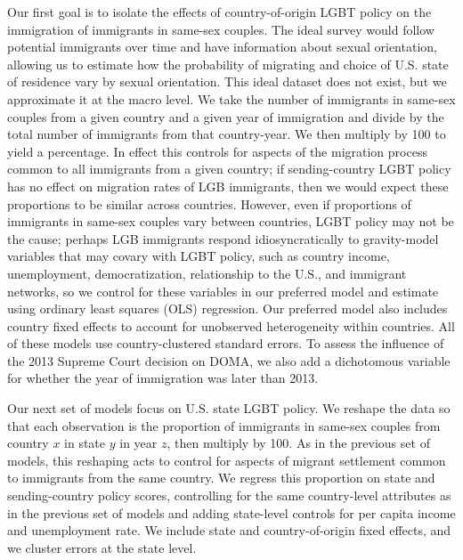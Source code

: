 \documentclass[
  11pt,
]{article}
\begin{document}
Our first goal is to isolate the effects of country-of-origin LGBT policy on the immigration of immigrants in same-sex couples. The ideal survey would follow potential immigrants over time and have information about sexual orientation, allowing us to estimate how the probability of migrating and choice of U.S. state of residence vary by sexual orientation. This ideal dataset does not exist, but we approximate it at the macro level. We take the number of immigrants in same-sex couples from a given country and a given year of immigration and divide by the total number of immigrants from that country-year. We then multiply by 100 to yield a percentage. In effect this controls for aspects of the migration process common to all immigrants from a given country; if sending-country LGBT policy has no effect on migration rates of LGB immigrants, then we would expect these proportions to be similar across countries. However, even if proportions of immigrants in same-sex couples vary between countries, LGBT policy may not be the cause; perhaps LGB immigrants respond idiosyncratically to gravity-model variables that may covary with LGBT policy, such as country income, unemployment, democratization, relationship to the U.S., and immigrant networks, so we control for these variables in our preferred model and estimate using ordinary least squares (OLS) regression. Our preferred model also includes country fixed effects to account for unobserved heterogeneity within countries. All of these models use country-clustered standard errors. To assess the influence of the 2013 Supreme Court decision on DOMA, we also add a dichotomous variable for whether the year of immigration was later than 2013.

Our next set of models focus on U.S. state LGBT policy. We reshape the data so that each observation is the proportion of immigrants in same-sex couples from country \(x\) in state \(y\) in year \(z\), then multiply by 100. As in the previous set of models, this reshaping acts to control for aspects of migrant settlement common to immigrants from the same country. We regress this proportion on state and sending-country policy scores, controlling for the same country-level attributes as in the previous set of models and adding state-level controls for per capita income and unemployment rate. We include state and country-of-origin fixed effects, and we cluster errors at the state level.
\end{document}
